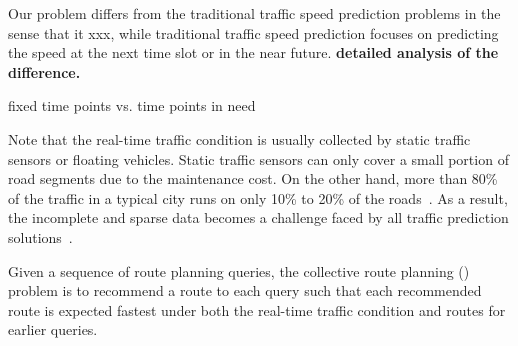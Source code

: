Our \ptsp problem differs from the traditional traffic speed prediction problems in the sense that it
xxx, while traditional traffic speed prediction focuses on predicting the speed at the next time slot or in the near future. {\bf detailed analysis of the difference.}

fixed time points vs. time points in need

Note that the real-time traffic condition is usually collected by static traffic sensors or floating vehicles. Static traffic sensors can only cover a small portion of road segments due to the maintenance cost. On the other hand, more than 80\% of the traffic in a typical city runs on only 10\% to 20\% of the roads~\cite{WuMSZZCWKDD16}. As a result, the incomplete and sparse data becomes a challenge faced by all traffic prediction solutions~\cite{Zhu2013TMC,Shang2014KDD,Lu2017Speed}.


\begin{definition} Given a sequence of route planning queries, the collective route planning (\crp) problem is to recommend a route to each query such that each recommended route is expected fastest under both the real-time traffic condition and routes for earlier queries.
\end{definition}
